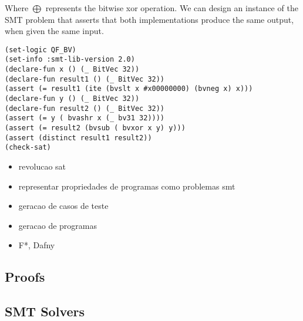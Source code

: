 Where $\bigoplus$ represents the bitwise xor operation. We can design an instance of the SMT problem that asserts that both implementations produce the same output, when given the same input.

\begin{verbatim}
(set-logic QF_BV)
(set-info :smt-lib-version 2.0)
(declare-fun x () (_ BitVec 32))
(declare-fun result1 () (_ BitVec 32))
(assert (= result1 (ite (bvslt x #x00000000) (bvneg x) x)))
(declare-fun y () (_ BitVec 32))
(declare-fun result2 () (_ BitVec 32))
(assert (= y ( bvashr x (_ bv31 32))))
(assert (= result2 (bvsub ( bvxor x y) y)))
(assert (distinct result1 result2))
(check-sat)
\end{verbatim}


\begin{itemize}
  \item revolucao sat
  \item representar propriedades de programas como problemas smt
  \item geracao de casos de teste
  \item geracao de programas
  \item F*, Dafny
\end{itemize}


\subsection{Proofs}

\subsection{SMT Solvers}


